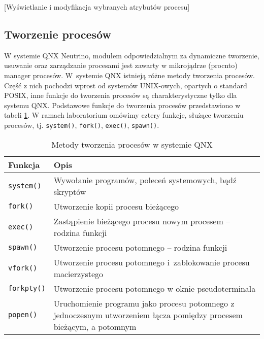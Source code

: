 \begin{example}{[Wyświetlanie i modyfikacja wybranych atrybutów procesu]}
  \label{ex:TEPBG}
  
\end{example}


\subsection{Tworzenie procesów}

W systemie QNX Neutrino, modułem odpowiedzialnym za dynamiczne tworzenie,
usuwanie oraz zarządzanie procesami jest zawarty w mikrojądrze (procnto)
manager procesów. W systemie QNX istnieją różne metody tworzenia procesów.
Część z nich pochodzi wprost od systemów UNIX-owych, opartych o standard POSIX,
inne funkcje do tworzenia procesów są charakterystyczne tylko dla systemu QNX.
Podstawowe funkcje do tworzenia procesów przedstawiono w tabeli
\ref{tab:IMJR3}. W ramach laboratorium omówimy cztery funkcje, służące
tworzeniu procesów, tj. \texttt{system()}, \texttt{fork()}, \texttt{exec()},
\texttt{spawn()}.

\begin{table}[h!]
  \centering
  \caption{Metody tworzenia procesów w systemie QNX}
  \label{tab:IMJR3}
  \begin{tabular}{|l|p{}|}
    \hline
    \textbf{Funkcja}    & \textbf{Opis}  \\ \hline
    \texttt{system()}   & Wywołanie programów, poleceń systemowych, bądź skryptów \\ \hline
    \texttt{fork()}     & Utworzenie kopii procesu bieżącego \\ \hline
    \texttt{exec()}     & Zastąpienie bieżącego procesu nowym procesem -- rodzina funkcji \\ \hline
    \texttt{spawn()}    & Utworzenie procesu potomnego -- rodzina funkcji \\ \hline
    \texttt{vfork()}    & Utworzenie procesu potomnego i zablokowanie procesu macierzystego \\ \hline
    \texttt{forkpty()}  & Utworzenie procesu potomnego w oknie pseudoterminala \\ \hline
    \texttt{popen()}    & Uruchomienie programu jako procesu potomnego z
                          jednoczesnym utworzeniem łącza pomiędzy procesem
                          bieżącym, a potomnym \\ \hline
  \end{tabular}
\end{table}

